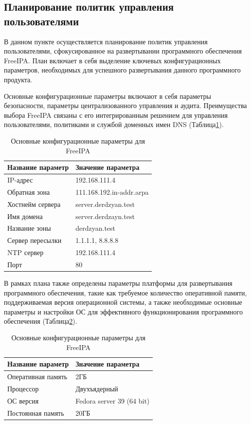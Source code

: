 \subsection{Планирование политик управления пользователями}

В данном пункте осуществляется планирование политик управления пользователями, сфокусированное на развертывании программного обеспечения FreeIPA. План включает в себя выделение ключевых конфигурационных параметров, необходимых для успешного развертывания данного программного продукта.

Основные конфигурационные параметры включают в себя параметры безопасности, параметры централизованного управления и аудита. Преимущества выбора FreeIPA связаны с его интегрированным решением для управления пользователями, политиками и службой доменных имен DNS (Таблица\;\ref{table:IPA_conf}).

\begin{table}[H]
\centering
{}
\caption{Основные конфигурационные параметры для FreeIPA\;\label{table:IPA_conf}}
\small
\begin{tabularx}{\textwidth}{|X|X|}
\hline
Название параметр	&	Значение параметра \\ \hline
IP-адрес		  	&	192.168.111.4	\\ \hline
Обратная зона	  	&	111.168.192.in-addr.arpa \\ \hline
Хостнейм сервера	&	server.derdzyan.test \\ \hline
Имя домена			&	server.derdzayn.test \\ \hline
Название зоны		&	derdzyan.test \\ \hline
Сервер пересылки	&	1.1.1.1, 8.8.8.8 \\ \hline
NTP сервер			&	192.168.111.4 \\ \hline
Порт				&	80 \\
\hline
\end{tabularx}
\end{table}


В рамках плана также определены параметры платформы для развертывания программного обеспечения, такие как требуемое количество оперативной памяти, поддерживаемая версия операционной системы, а также необходимые основные параметры и настройки ОС для эффективного функционирования программного обеспечения (Таблица\;\ref{table:IPA_platorm_param}).

\begin{table}[H]
\centering
{}
\caption{Основные конфигурационные параметры для FreeIPA\;\label{table:IPA_platorm_param}}
\small
\begin{tabularx}{\textwidth}{|X|X|}
\hline
Название параметр & Значение параметра \\ \hline
Оперативная память	&	2ГБ \\ \hline
Процессор			& 	Двухъядерный	\\ \hline
ОС версия			& 	Fedora server 39 (64 bit)	\\ \hline
Постоянная память	&	20ГБ \\
\hline
\end{tabularx}
\end{table}

